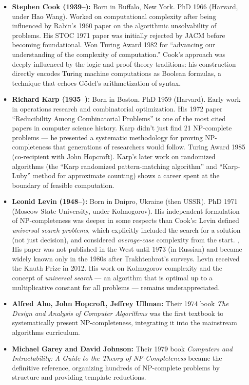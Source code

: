 \begin{itemize}
\item \textbf{Stephen Cook (1939--):} Born in Buffalo, New York. PhD 1966 (Harvard, under Hao Wang). Worked on computational complexity after being influenced by Rabin's 1960 paper on the algorithmic unsolvability of problems. His STOC 1971 paper was initially rejected by JACM before becoming foundational. Won Turing Award 1982 for ``advancing our understanding of the complexity of computation.'' Cook's approach was deeply influenced by the logic and proof theory traditions: his construction directly encodes Turing machine computations as Boolean formulas, a technique that echoes G\"odel's arithmetization of syntax.
\item \textbf{Richard Karp (1935--):} Born in Boston. PhD 1959 (Harvard). Early work in operations research and combinatorial optimization. His 1972 paper ``Reducibility Among Combinatorial Problems'' is one of the most cited papers in computer science history. Karp didn't just find 21 NP-complete problems — he presented a systematic methodology for proving NP-completeness that generations of researchers would follow. Turing Award 1985 (co-recipient with John Hopcroft). Karp's later work on randomized algorithms (the ``Karp randomized pattern-matching algorithm'' and ``Karp-Luby'' method for approximate counting) shows a career spent at the boundary of feasible computation.
\item \textbf{Leonid Levin (1948--):} Born in Dnipro, Ukraine (then USSR). PhD 1971 (Moscow State University, under Kolmogorov). His independent formulation of NP-completeness was deeper in some respects than Cook's: Levin defined \emph{universal search problems}, which explicitly included the search for a solution (not just decision), and considered \emph{average-case} complexity from the start. \cite{trakhtenbrot1973}, His paper was not published in the West until 1973 (in Russian) and became widely known only in the 1980s after Trakhtenbrot's surveys. Levin received the Knuth Prize in 2012. His work on Kolmogorov complexity and the concept of \emph{universal search} — an algorithm that is optimal up to a multiplicative constant for all problems — remains underappreciated.
\item \textbf{Alfred Aho, John Hopcroft, Jeffrey Ullman:} Their 1974 book \emph{The Design and Analysis of Computer Algorithms} was the first textbook to systematically present NP-completeness, integrating it into the mainstream algorithms curriculum.
\item \textbf{Michael Garey and David Johnson:} Their 1979 book \emph{Computers and Intractability: A Guide to the Theory of NP-Completeness} became the definitive reference, organizing hundreds of NP-complete problems by structure and providing template reductions.
\end{itemize}

